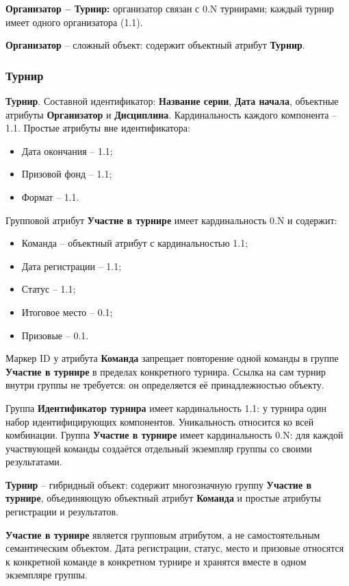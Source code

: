 \documentclass[a4paper, 14pt]{extarticle}
\begin{document}
\textbf{Организатор -- Турнир:} организатор связан с 0.N турнирами; каждый турнир имеет одного организатора (1.1).

\textbf{Организатор} -- сложный объект: содержит объектный атрибут \textbf{Турнир}.

\subsubsection{Турнир}

\textbf{Турнир}. Составной идентификатор: \textbf{Название серии}, \textbf{Дата начала}, объектные атрибуты \textbf{Организатор} и \textbf{Дисциплина}. Кардинальность каждого компонента -- 1.1. Простые атрибуты вне идентификатора:
  \begin{itemize}
    \item Дата окончания -- 1.1;
    \item Призовой фонд -- 1.1;
    \item Формат -- 1.1.
  \end{itemize}
  Групповой атрибут \textbf{Участие в турнире} имеет кардинальность 0.N и содержит:
  \begin{itemize}
    \item Команда -- объектный атрибут с кардинальностью 1.1;
    \item Дата регистрации -- 1.1;
    \item Статус -- 1.1;
    \item Итоговое место -- 0.1;
    \item Призовые -- 0.1.
  \end{itemize}
  Маркер ID у атрибута \textbf{Команда} запрещает повторение одной команды в группе \textbf{Участие в турнире} в пределах конкретного турнира. Ссылка на сам турнир внутри группы не требуется: он определяется её принадлежностью объекту.

Группа \textbf{Идентификатор турнира} имеет кардинальность 1.1: у турнира один набор идентифицирующих компонентов. Уникальность относится ко всей комбинации. Группа \textbf{Участие в турнире} имеет кардинальность 0.N: для каждой участвующей команды создаётся отдельный экземпляр группы со своими результатами.

\textbf{Турнир} -- гибридный объект: содержит многозначную группу \textbf{Участие в турнире}, объединяющую объектный атрибут \textbf{Команда} и простые атрибуты регистрации и результатов.

\textbf{Участие в турнире} является групповым атрибутом, а не самостоятельным семантическим объектом. Дата регистрации, статус, место и призовые относятся к конкретной команде в конкретном турнире и хранятся вместе в одном экземпляре группы.
\end{document}
